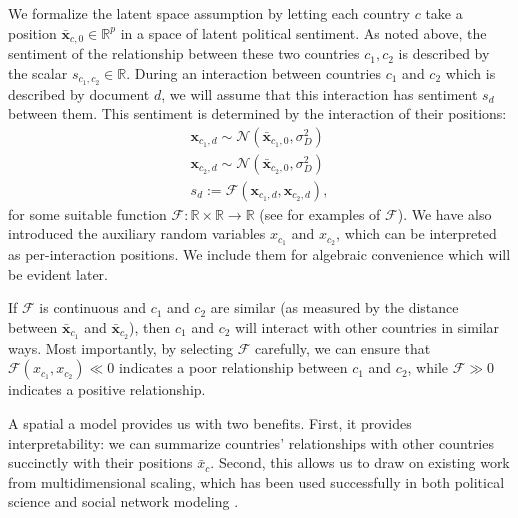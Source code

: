 We formalize the latent space assumption by letting each country $c$
take a position $\bm \bar x_{c,0} \in \mathbb{R}^p$ in a space of
latent political sentiment. As noted above, the sentiment of the
relationship between these two countries $c_1, c_2$ is described by
the scalar $s_{c_1,c_2} \in \mathbb{R}$.  During an interaction
between countries $c_1$ and $c_2$ which is described by document $d$,
we will assume that this interaction has sentiment $s_d$ between them.
This sentiment is determined by the interaction of their positions:
\begin{align}
  \bm x_{c_1,d} \sim \mathcal{N}(\bm \bar x_{c_1, 0}, \sigma_D^2) \nonumber \\
  \bm x_{c_2,d} \sim \mathcal{N}(\bm \bar x_{c_2, 0}, \sigma_D^2) \nonumber \\
  s_d := \mathcal{F}(\bm x_{c_1,d}, \bm x_{c_2,d}), \label{eq:sentiment_space}
\end{align}
for some suitable function $\mathcal{F}: \mathbb{R} \times \mathbb{R}
\rightarrow \mathbb{R}$ (see  for examples of
$\mathcal{F}$).  We have also introduced the auxiliary random
variables $x_{c_1}$ and $x_{c_2}$, which can be interpreted as
per-interaction positions.  We include them for algebraic convenience
which will be evident later.

If $\mathcal{F}$ is continuous and $c_1$ and $c_2$ are similar (as
measured by the distance between $\bm \bar x_{c_1}$ and $\bm \bar
x_{c_2}$), then $c_1$ and $c_2$ will interact with other countries in
similar ways.  Most importantly, by selecting $\mathcal{F}$
carefully, we can ensure that $\mathcal{F}(x_{c_1}, x_{c_2}) \ll 0$
indicates a poor relationship between $c_1$ and $c_2$, while
$\mathcal{F} \gg 0$ indicates a positive relationship.

A spatial a model provides us with two benefits. First, it provides
interpretability: we can summarize countries' relationships with other
countries succinctly with their positions $\bar x_c$.  Second, this
allows us to draw on existing work from multidimensional scaling,
which has been used successfully in both political science
\citep{martin:2002,jackman:2001} and social network modeling
\citep{hoff:2002,chang:2009}.


